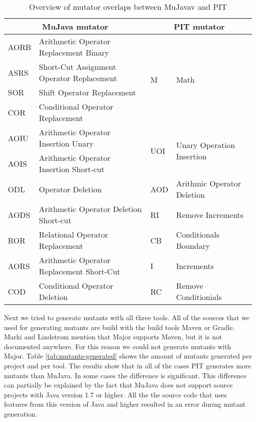 \documentclass[../main]{subfiles}
\begin{document}
\begin{table}[htb]
\centering
\begin{tabular}{|l|l|l|l|}
\hline
\multicolumn{2}{|c|}{\textbf{ MuJava mutator}}      & \multicolumn{2}{c|}{\textbf{PIT mutator}}                         \\ \hline
AORB & Arithmetic Operator Replacement Binary      & \multirow{4}{*}{M}   & \multirow{4}{*}{Math}                      \\ \cline{1-2}
ASRS & Short-Cut Assignment   Operator Replacement &                      &                                            \\ \cline{1-2}
SOR  & Shift Operator   Replacement                &                      &                                            \\ \cline{1-2}
COR  & Conditional Operator   Replacement          &                      &                                            \\ \hline
AOIU & Arithmetic Operator   Insertion Unary       & \multirow{2}{*}{UOI} & \multirow{2}{*}{Unary Operation Insertion} \\ \cline{1-2}
AOIS & Arithmetic Operator   Insertion Short-cut   &                      &                                            \\ \hline
ODL  & Operator Deletion                           & AOD                  & Arithmic Operator   Deletion               \\ \hline
AODS & Arithmetic Operator   Deletion Short-cut    & RI                   & Remove Increments                          \\ \hline
ROR  & Relational Operator   Replacement           & CB                   & Conditionals Boundary                      \\ \hline
AORS & Arithmetic Operator   Replacement Short-Cut & I                    & Increments                                 \\ \hline
COD  & Conditional Operator   Deletion             & RC                   & Remove Conditionials                       \\ \hline
\end{tabular}
\caption{\label{tab:mutators-overlap}Overview of mutator overlaps between  MuJavav and PIT}
\end{table}
Next we tried to generate mutants with all three tools. 
All of the sources that we used for generating mutants are build with the build tools Maven or Gradle. 
Marki and Lindstrom\cite{Marki2017MutationJava} mention that Major supports Maven, but it is not documented anywhere.
For this reason we could not generate mutants with Major.
Table \ref{tab:mutants-generated} shows the amount of mutants generated per project and per tool. The results show that in all of the cases PIT generates more mutants than MuJava. In some cases the difference is significant. This difference can partially be explained by the fact that MuJava does not support source projects with Java version 1.7 or higher\cite{mujava}. All the the source code that uses features from this version of Java and higher resulted in an error during mutant generation.
\end{document}
